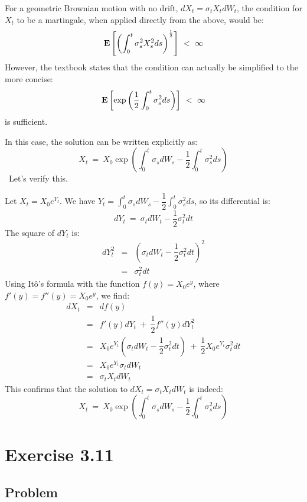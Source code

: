 \documentclass[uplatex,a4j,12pt,dvipdfmx]{jsarticle}
\begin{document}
For a geometric Brownian motion with no drift, $ dX_{t} = \sigma_{t} X_{t} dW_{t} $, the condition for $X_{t}$ to be a martingale, when applied directly from the above, would be:
$$
	{\bf E}
	\left[
		\left(
		\int^{t}_{0} \sigma_{s}^{2} X_{s}^{2} ds
		\right)^{\frac{1}{2}}
		\right]
	\ < \
	\infty
$$
However, the textbook states that the condition can actually be simplified to the more concise:
$$
	{\bf E}
	\left[
		\exp
		\left(
		\dfrac{1}{2}
		\int^{t}_{0} \sigma_{s}^{2} ds
		\right)
		\right]
	\ < \
	\infty
$$
is sufficient.

In this case, the solution can be written explicitly as:
$$
	X_{t}
	\ = \
	X_{0}
	\exp
	\left(
	\int^{t}_{0}
	\sigma_{s} dW_{s}
	-
	\dfrac{1}{2}
	\int^{t}_{0} \sigma_{s}^{2} ds
	\right)
$$
\
Let's verify this.

Let $X_{t} = X_{0} e^{Y_{t}}$. We have $Y_{t} = \displaystyle \int^{t}_{0} \sigma_{s} dW_{s} - \dfrac{1}{2} \int^{t}_{0} \sigma_{s}^{2} ds$, so its differential is:
$$
	d Y_{t}
	\ = \
	\sigma_{t} dW_{t}
	-
	\dfrac{1}{2}
	\sigma_{t}^{2} dt
$$
The square of $dY_{t}$ is:
%
\begin{eqnarray*}
	d Y_{t}^{2}
	&=&
	\left(
	\sigma_{t} dW_{t}
	-
	\dfrac{1}{2}
	\sigma_{t}^{2} dt
	\right)^{2}
	\\ &=&
	\sigma_{t}^{2} dt
\end{eqnarray*}
%
Using Itô's formula with the function $f(y)=X_{0} e^{y}$, where $f'(y) = f''(y) = X_{0} e^{y}$, we find:
%
\begin{eqnarray*}
	d X_{t}
	&=&
	d f(y)
	\\ &=&
	f'(y) dY_{t}
	\ + \
	\dfrac{1}{2} f''(y) dY_{t}^{2}
	\\ &=&
	X_{0} e^{Y_{t}}
	\left(
	\sigma_{t} dW_{t}
	-
	\dfrac{1}{2}
	\sigma_{t}^{2} dt
	\right)
	\ + \
	\dfrac{1}{2}
	X_{0} e^{Y_{t}}
	\sigma_{t}^{2} dt
	\\ &=&
	X_{0} e^{Y_{t}}
	\sigma_{t} dW_{t}
	\\ &=&
	\sigma_{t} X_{t} dW_{t}
\end{eqnarray*}
%
This confirms that the solution to $dX_{t} = \sigma_{t} X_{t} dW_{t}$ is indeed:
$$
	X_{t}
	\ = \
	X_{0}
	\exp
	\left(
	\int^{t}_{0}
	\sigma_{s} dW_{s}
	-
	\dfrac{1}{2}
	\int^{t}_{0} \sigma_{s}^{2} ds
	\right)
$$
\section{Exercise 3.11}

\subsection{Problem}
\end{document}
